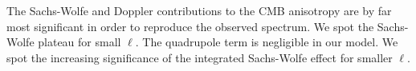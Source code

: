


The Sachs-Wolfe and Doppler contributions to the CMB anisotropy are by far most significant in order to reproduce the observed spectrum. We spot the Sachs-Wolfe plateau for small $\ell$. The quadrupole term is negligible in our model. We spot the increasing significance of the integrated Sachs-Wolfe effect for smaller $\ell$.
